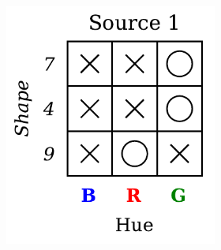 \begin{definition}
\begin{figure}[H]
        \begin{subfigure}[b]{0.45\textwidth}
            \centering
            \begin{subfigure}[b]{0.48\textwidth}
                \centering
                \includegraphics[width=\textwidth]{img/datasets/3-CGO_fact=hue_env=0.pdf}
            \end{subfigure}
            \begin{subfigure}[b]{0.48\textwidth}
                \centering

\end{subfigure}
\end{subfigure}
\end{figure}
\end{definition}
